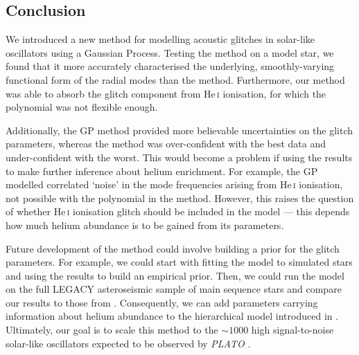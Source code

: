 
\subsection{Conclusion}

We introduced a new method for modelling acoustic glitches in solar-like oscillators using a Gaussian Process. Testing the method on a model star, we found that it more accurately characterised the underlying, smoothly-varying functional form of the radial modes than the 
 method. Furthermore, our method was able to absorb the glitch component from He\,\textsc{i} ionisation, for which the polynomial was not flexible enough.

Additionally, the GP method provided more believable uncertainties on the glitch parameters, whereas the  method was over-confident with the best data and under-confident with the worst. This would become a problem if using the results to make further inference about helium enrichment. For example, the GP modelled correlated `noise' in the mode frequencies arising from He\,\textsc{i} ionisation, not possible with the polynomial in the  method. However, this raises the question of whether He\,\textsc{i} ionisation glitch should be included in the model --- this depends how much helium abundance is to be gained from its parameters.

Future development of the method could involve building a prior for the glitch parameters. For example, we could start with fitting the model to simulated stars and using the results to build an empirical prior. Then, we could run the model on the full LEGACY asteroseismic sample of main sequence stars \citep{Lund.SilvaAguirre.ea2017} and compare our results to those from \citet{Verma.Raodeo.ea2019}. Consequently, we can add parameters carrying information about helium abundance to the hierarchical model introduced in \citet{Lyttle.Davies.ea2021}. Ultimately, our goal is to scale this method to the \(\sim \num{1000}\) high signal-to-noise solar-like oscillators expected to be observed by \emph{PLATO} \citep{Rauer.Catala.ea2014}.

